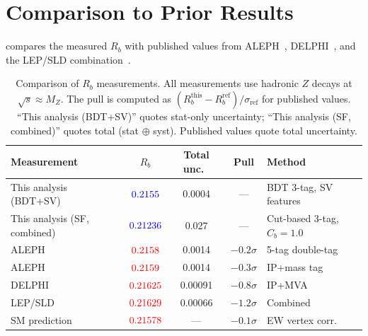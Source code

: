 \documentclass[11pt,a4paper]{article}
\newcommand{\measured}[1]{\textcolor{blue}{#1}}
\newcommand{\external}[1]{\textcolor{red}{#1}}
\begin{document}
\section{Comparison to Prior Results}
\label{sec:comparison}

 compares the measured $R_b$ with published
values from ALEPH~\cite{ALEPH:Rb:1996,ALEPH:Rb:precise},
DELPHI~\cite{DELPHI:Rb}, and the LEP/SLD
combination~\cite{LEP:EWWG:2005}.

\begin{table}[htbp]
\centering
\caption{Comparison of $R_b$ measurements.
All measurements use hadronic $Z$ decays at $\sqrt{s} \approx M_Z$.
The pull is computed as $(R_b^\text{this} - R_b^\text{ref}) /
\sigma_\text{ref}$ for published values.
``This analysis (BDT+SV)'' quotes stat-only uncertainty;
``This analysis (SF, combined)'' quotes total (stat $\oplus$ syst).
Published values quote total uncertainty.}
\label{tbl:comparison_rb}
\begin{tabular}{lcccl}
\toprule
Measurement & $R_b$ & Total unc.\ & Pull & Method \\
\midrule
This analysis (BDT+SV) & $\measured{0.2155}$ & 0.0004 & --- &
  BDT 3-tag, SV features \\
This analysis (SF, combined) & $\measured{0.21236}$ & 0.027 & --- &
  Cut-based 3-tag, $C_b=1.0$ \\
ALEPH~\cite{ALEPH:Rb:1996} & $\external{0.2158}$ & 0.0014 &
  $-0.2\sigma$ & 5-tag double-tag \\
ALEPH~\cite{ALEPH:Rb:precise} & $\external{0.2159}$ & 0.0014 &
  $-0.3\sigma$ & IP+mass tag \\
DELPHI~\cite{DELPHI:Rb} & $\external{0.21625}$ & 0.00091 &
  $-0.8\sigma$ & IP+MVA \\
LEP/SLD~\cite{LEP:EWWG:2005} & $\external{0.21629}$ & 0.00066 &
  $-1.2\sigma$ & Combined \\
SM prediction & $\external{0.21578}$ & --- & $-0.1\sigma$ &
  EW vertex corr.\ \\
\bottomrule
\end{tabular}
\end{table}
\end{document}
